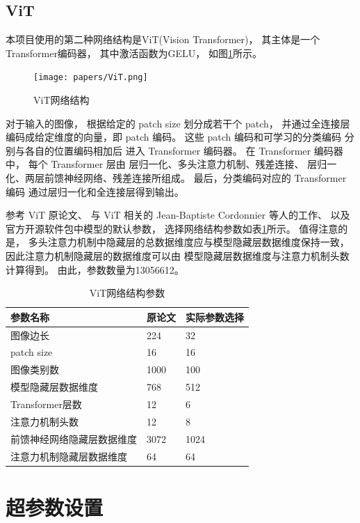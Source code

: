 \documentclass[12pt]{article}
\begin{document}
\subsection{ViT}

本项目使用的第二种网络结构是ViT(Vision Transformer)，
其主体是一个Transformer编码器，
其中激活函数为GELU，
如图\ref{fig:ViT}所示。

\begin{figure}[h]
	\texttt{[image: papers/ViT.png]}
	\caption{ViT网络结构}
	\label{fig:ViT}
\end{figure}

对于输入的图像，
根据给定的 patch size 划分成若干个 patch，
并通过全连接层编码成给定维度的向量，即 patch 编码。
这些 patch 编码和可学习的分类编码
分别与各自的位置编码相加后
进入 Transformer 编码器。
在 Transformer 编码器中，
每个 Transformer 层由
层归一化、多头注意力机制、残差连接、
层归一化、两层前馈神经网络、残差连接所组成。
最后，分类编码对应的 Transformer 编码
通过层归一化和全连接层得到输出。

参考 ViT 原论文、
与 ViT 相关的 Jean-Baptiste Cordonnier 等人的工作、
以及官方开源软件包中模型的默认参数，
选择网络结构参数如表\ref{tab:Transformer}所示。
值得注意的是，
多头注意力机制中隐藏层的总数据维度应与模型隐藏层数据维度保持一致，
因此注意力机制隐藏层的数据维度可以由
模型隐藏层数据维度与注意力机制头数计算得到。
由此，参数数量为13056612。

\begin{table}[h]
	\centering
	\begin{tabular}{lll} 
		\hline
		参数名称 & 原论文 & 实际参数选择 \\
		\hline
		图像边长 & 224 & 32 \\
		patch size & 16 & 16 \\
		图像类别数 & 1000 & 100 \\
		模型隐藏层数据维度 & 768 & 512 \\
		Transformer层数 & 12 & 6 \\
		注意力机制头数 & 12 & 8 \\ 
		前馈神经网络隐藏层数据维度 & 3072 & 1024 \\	
		注意力机制隐藏层数据维度 & 64 & 64 \\
		\hline
	\end{tabular}
	\caption{ViT网络结构参数}
	\label{tab:Transformer}
\end{table}

\section{超参数设置}
\end{document}
